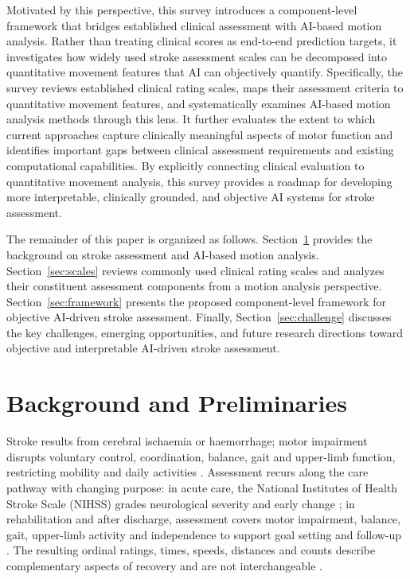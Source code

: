 \documentclass[11pt]{article}
\begin{document}
Motivated by this perspective, this survey introduces a component-level framework that bridges established clinical assessment with AI-based motion analysis. Rather than treating clinical scores as end-to-end prediction targets, it investigates how widely used stroke assessment scales can be decomposed into quantitative movement features that AI can objectively quantify. Specifically, the survey reviews established clinical rating scales, maps their assessment criteria to quantitative movement features, and systematically examines AI-based motion analysis methods through this lens. It further evaluates the extent to which current approaches capture clinically meaningful aspects of motor function and identifies important gaps between clinical assessment requirements and existing computational capabilities. By explicitly connecting clinical evaluation to quantitative movement analysis, this survey provides a roadmap for developing more interpretable, clinically grounded, and objective AI systems for stroke assessment.

The remainder of this paper is organized as follows. Section~\ref{sec:background} provides the background on stroke assessment and AI-based motion analysis. Section~\ref{sec:scales} reviews commonly used clinical rating scales and analyzes their constituent assessment components from a motion analysis perspective. Section~\ref{sec:framework} presents the proposed component-level framework for objective AI-driven stroke assessment. Finally, Section~\ref{sec:challenge} discusses the key challenges, emerging opportunities, and future research directions toward objective and interpretable AI-driven stroke assessment.


\section{Background and Preliminaries}
\label{sec:background}

Stroke results from cerebral ischaemia or haemorrhage; motor impairment disrupts voluntary control, coordination, balance, gait and upper-limb function, restricting mobility and daily activities \cite{WHO2025StrokeFactSheet,S1VADoD2024StrokeRehab}. Assessment recurs along the care pathway with changing purpose: in acute care, the National Institutes of Health Stroke Scale (NIHSS) grades neurological severity and early change \cite{S1Prabhakaran2026AHAASAAIS,ScaleBrott1989NIHSS}; in rehabilitation and after discharge, assessment covers motor impairment, balance, gait, upper-limb activity and independence to support goal setting and follow-up \cite{S1Winstein2016AHAASARehab,S1VADoD2024StrokeRehab,S1NICE2023NG236}. The resulting ordinal ratings, times, speeds, distances and counts describe complementary aspects of recovery and are not interchangeable \cite{ScaleHarrison2013Clinimetric,CoreKwakkel2017SRRRSensorimotor,CoreVanCriekinge2024SRRRBalanceMobility}.
\end{document}

